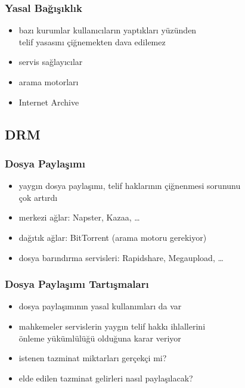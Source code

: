 \documentclass[dvipsnames]{beamer}
\theoremstyle{plain}
\begin{document}
%

\begin{frame}
  \frametitle{Yasal Bağışıklık}

  \begin{itemize}
    \item bazı kurumlar kullanıcıların yaptıkları yüzünden\\
      telif yasasını çiğnemekten dava edilemez

    \medskip
    \item servis sağlayıcılar
    \item arama motorları
    \item Internet Archive
  \end{itemize}
\end{frame}

\subsection{DRM}

\begin{frame}
  \frametitle{Dosya Paylaşımı}

  \begin{itemize}
    \item yaygın dosya paylaşımı, telif haklarının çiğnenmesi sorununu\\
      çok artırdı
    \item merkezi ağlar: Napster, Kazaa, \ldots
    \item dağıtık ağlar: BitTorrent (arama motoru gerekiyor)
    \item dosya barındırma servisleri: Rapidshare, Megaupload, \ldots
  \end{itemize}
\end{frame}

\begin{frame}
  \frametitle{Dosya Paylaşımı Tartışmaları}

  \begin{itemize}
    \item dosya paylaşımının yasal kullanımları da var
    \item mahkemeler servislerin yaygın telif hakkı ihlallerini\\
      önleme yükümlülüğü olduğuna karar veriyor
    \item istenen tazminat miktarları gerçekçi mi?
    \item elde edilen tazminat gelirleri nasıl paylaşılacak?
  \end{itemize}
\end{frame}
\end{document}
